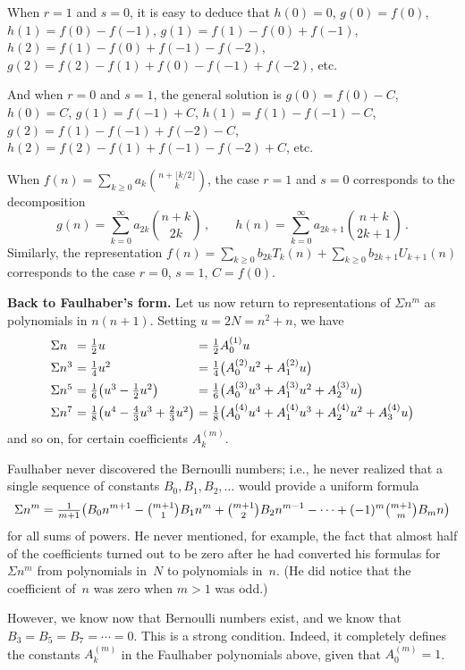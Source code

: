 When $r=1$ and $s=0$, it is easy to deduce that $h(0)=0$, $g(0)=f(0)$,
$h(1)=f(0)-f(-1)$, $g(1)=f(1)-f(0)+f(-1)$,
$h(2)=f(1)-f(0)+f(-1)-f(-2)$, $g(2)=f(2)-f(1)+f(0)-f(-1)+f(-2)$, etc.

And when $r=0$ and $s=1$, the general solution is
$g(0)=f(0)-C$, $h(0)=C$, $g(1)=f(-1)+C$, $h(1)=f(1)-f(-1)-C$,
$g(2)=f(1)-f(-1)+f(-2)-C$, $h(2)=f(2)-f(1)+f(-1)-f(-2)+C$,
etc.\quad\pfbox

\bigskip
When $f(n)=\sum_{k\geq 0}a_k{n+\lfloor k/2\rfloor\choose k}$, the case
$r=1$ and $s=0$ corresponds to the decomposition
$$g(n)=\sum_{k=0}^{\infty}a_{2k}{n+k\choose 2k}\,,\qquad
h(n)=\sum_{k=0}^{\infty}a_{2k+1}{n+k\choose 2k+1}\,.$$
Similarly, the representation $f(n)=\sum_{k\geq
0}b_{2k}T_k(n)+\sum_{k\geq 0}b_{2k+1}U_{k+1}(n)$ corresponds to the
case $r=0$, $s=1$, $C=f(0)$.


\bigskip\noindent
{\bf Back to Faulhaber's form.}\enspace
Let us now return to representations of $\Sigma n^m$ as polynomials in
$n(n+1)$. Setting $u=2N=n^2+n$, we have
$$\vcenter{\halign{$#$\hfil\ &$#$\hfil\ &$#$\hfil\cr
\Sigma n&={1\over 2}u&={1\over 2}A_0^{(1)}u\cr
\noalign{\smallskip}
\Sigma n^3&={1\over 4}u^2&={1\over 4}\bigl(A_0^{(2)}u^2+A_1^{(2)}u\bigr)\cr
\noalign{\smallskip}
\Sigma n^5&={1\over 6}\bigl(u^3-{1\over 2}u^2\bigr)
&={1\over 6}\bigl(A_0^{(3)}u^3+A_1^{(3)}u^2+A_2^{(3)}u\bigr)\cr
\noalign{\smallskip}
\Sigma n^7&={1\over 8}\bigl(u^4-{4\over 3}u^3+{2\over 3}u^2\bigr)
&={1\over
8}\bigl(A_0^{(4)}u^4+A_1^{(4)}u^3+A_2^{(4)}u^2+A_3^{(4)}u\bigr)\cr}}$$
and so on, 
for certain coefficients $A_k^{(m)}$.

Faulhaber never discovered the Bernoulli numbers; i.e., he never
realized that a single sequence of constants $B_0,B_1,B_2,\ldots$ would
provide a uniform formula
$$\Sigma n^m={\textstyle{1\over
m+1}}\bigl(B_0n^{m+1}-{\textstyle{m+1\choose
1}}B_1n^m+{\textstyle{m+1\choose
2}}B_2n^{m-1}-\cdots+(-1)^m{\textstyle{m+1\choose m}}B_mn\bigr)$$
for all sums of powers. He never mentioned, for example, the fact that
almost half of the coefficients turned out to be zero after he had
converted his formulas for $\Sigma n^m$ from polynomials in~$N$ to
polynomials in~$n$. (He did notice that the coefficient of~$n$ was
zero when $m>1$ was odd.)

However, we know now that Bernoulli numbers exist, and we know that
$B_3=B_5=B_7=\cdots =0$. This is a strong condition. Indeed, it
completely defines the constants $A_k^{(m)}$ in the Faulhaber
polynomials above, given that $A_0^{(m)}=1$.

